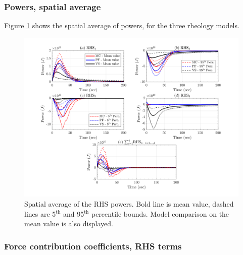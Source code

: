 \documentclass{article}
\begin{document}
\subsubsection{Powers, spatial average}
Figure \ref{fig:Colima-Power-spatial} shows the spatial average of powers, for the three rheology models.
\begin{figure}[H]
        \centering
        \includegraphics[width=1\textwidth]{BAF_VolcanDeColima/AveragedMeasurments/PowersColima.png}
        \caption{Spatial average of the RHS powers. Bold line is mean value, dashed lines are 5$^{\mathrm{th}}$ and 95$^{\mathrm{th}}$ percentile bounds. Model comparison on the mean value is also displayed.}
        \label{fig:Colima-Power-spatial}
\end{figure}

\subsubsection{Force contribution coefficients, RHS terms}
\end{document}
